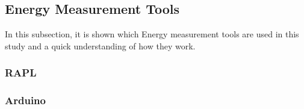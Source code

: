 \subsection{Energy Measurement Tools}
In this subsection, it is shown which Energy measurement tools are used in this study and a quick understanding of how they work.

\subsubsection{RAPL}

\subsubsection{Arduino}

